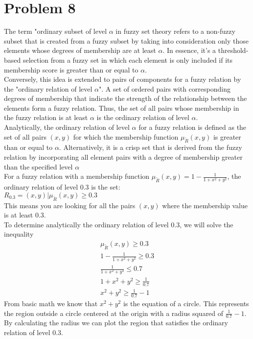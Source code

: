 \section{Problem 8}
The term "ordinary subset of level $\alpha$ in fuzzy set theory refers to a non-fuzzy subset that is created from a fuzzy subset by taking into consideration only those elements whose degrees of membership are at least $\alpha$. In essence, it's a threshold-based selection from a fuzzy set in which each element is only included if its membership score is greater than or equal to $\alpha$.\\
Conversely, this idea is extended to pairs of components for a fuzzy relation by the "ordinary relation of level $\alpha$". A set of ordered pairs with corresponding degrees of membership that indicate the strength of the relationship between the elements form a fuzzy relation. Thus, the set of all pairs whose membership in the fuzzy relation is at least $\alpha$ is the ordinary relation of level $\alpha$. \\

Analytically, the ordinary relation of level $\alpha$ for a fuzzy relation is defined as the set of all pairs $(x,y)$ for which the membership function $\mu_{\tilde{R}}(x,y)$ is greater than or equal to $\alpha$. Alternatively, it is a crisp set that is derived from the fuzzy relation by incorporating all element pairs with a degree of membership greater than the specified level $\alpha$\\

For a fuzzy relation with a membership function $\mu_{\tilde{R}}(x,y) = 1 - \frac{1}{1+x^2+y^2}$, the ordinary relation of level $0.3$ is the set:\\
$R_{0.3} = {(x,y) | \mu_{\tilde{R}}(x,y) \geq 0.3}$\\
This means you are looking for all the pairs $(x,y)$ where the membership value is at least $0.3$.\\

To determine analytically the ordinary relation of level $0.3$, we will solve the inequality
\begin{align*}
	\mu_{\tilde{R}}(x,y) \geq 0.3 \\
	1 - \frac{1}{1+x^2+y^2} \geq 0.3 \\
	\frac{1}{1+x^2+y^2} \leq 0.7 \\
	1 + x^2 + y^2 \geq \frac{1}{0.7} \\
	x^2 + y^2 \geq \frac{1}{0.7} - 1
\end{align*}
From basic math we know that $	x^2 + y^2$ is the equation of a circle. This represents the region outside a circle centered at the origin with a radius squared of $\frac{1}{0.7} - 1$. By calculating the radius we can plot the region that satisfies the ordinary relation of level 0.3.